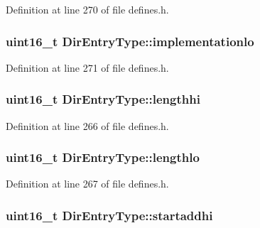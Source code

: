 Definition at line 270 of file defines.\+h.

\subsubsection[{\texorpdfstring{implementationlo}{implementationlo}}]{\setlength{\rightskip}{0pt plus 5cm}uint16\+\_\+t Dir\+Entry\+Type\+::implementationlo}\hypertarget{structDirEntryType_a8164d577c06fb7c312aaa4955d491449}{}\label{structDirEntryType_a8164d577c06fb7c312aaa4955d491449}


Definition at line 271 of file defines.\+h.

\subsubsection[{\texorpdfstring{lengthhi}{lengthhi}}]{\setlength{\rightskip}{0pt plus 5cm}uint16\+\_\+t Dir\+Entry\+Type\+::lengthhi}\hypertarget{structDirEntryType_ad7aaba7b01038bc8bacb096bd66fff08}{}\label{structDirEntryType_ad7aaba7b01038bc8bacb096bd66fff08}


Definition at line 266 of file defines.\+h.

\subsubsection[{\texorpdfstring{lengthlo}{lengthlo}}]{\setlength{\rightskip}{0pt plus 5cm}uint16\+\_\+t Dir\+Entry\+Type\+::lengthlo}\hypertarget{structDirEntryType_ad1cde25a0229866557cd5983c27fbd31}{}\label{structDirEntryType_ad1cde25a0229866557cd5983c27fbd31}


Definition at line 267 of file defines.\+h.

\subsubsection[{\texorpdfstring{startaddhi}{startaddhi}}]{\setlength{\rightskip}{0pt plus 5cm}uint16\+\_\+t Dir\+Entry\+Type\+::startaddhi}\hypertarget{structDirEntryType_a0cab2915e9f864e25b24d298c36c11db}{}\label{structDirEntryType_a0cab2915e9f864e25b24d298c36c11db}


